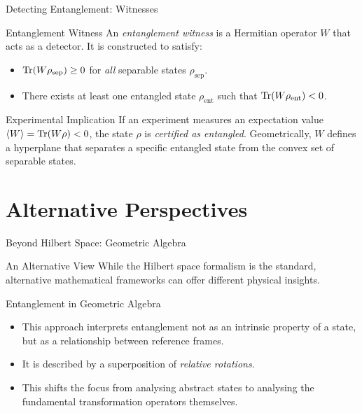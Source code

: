 \begin{frame}{Detecting Entanglement: Witnesses}
  \begin{block}{Entanglement Witness}
    An \emph{entanglement witness} is a Hermitian operator $W$ that acts as a
    detector. It is constructed to satisfy:
    \begin{itemize}
      \item $\mathrm{Tr}(W \rho_{\text{sep}}) \ge 0$ for \emph{all} separable states
        $\rho_{\text{sep}}$.
        \pause
      \item There exists at least one entangled state $\rho_{\text{ent}}$ such
        that $\mathrm{Tr}(W \rho_{\text{ent}}) < 0$.
    \end{itemize}
  \end{block}
  \pause
  \begin{alertblock}{Experimental Implication}
    If an experiment measures an expectation value $\braket{W} = \mathrm{Tr}(W \rho) <
    0$, the state $\rho$ is \emph{certified as entangled}.
    \vspace{1em}
    Geometrically, $W$ defines a hyperplane that separates a specific entangled
    state from the convex set of separable states.
  \end{alertblock}
\end{frame}


\section{Alternative Perspectives}


\begin{frame}{Beyond Hilbert Space: Geometric Algebra}
  \begin{block}{An Alternative View}
    While the Hilbert space formalism is the standard, alternative mathematical
    frameworks can offer different physical insights.
  \end{block}
  \pause
  \begin{alertblock}{Entanglement in Geometric Algebra}
    \begin{itemize}
      \item This approach interprets entanglement not as an intrinsic property
        of a state, but as a relationship between reference frames.
        \pause
      \item It is described by a superposition of \emph{relative rotations}.
        \pause
      \item This shifts the focus from analysing abstract states to analysing
        the fundamental transformation operators themselves.
    \end{itemize}
  \end{alertblock}
\end{frame}

